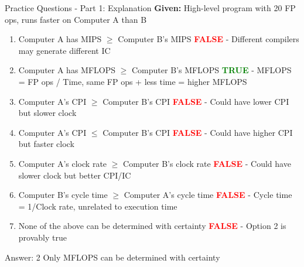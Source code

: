 \documentclass[aspectratio=169,12pt]{beamer}
\begin{document}
\begin{frame}{Practice Questions - Part 1: Explanation}
\small
\textbf{Given:} High-level program with 20 FP ops, runs faster on Computer A than B

\begin{enumerate}
    \item Computer A has MIPS $\geq$ Computer B's MIPS
    \pause \textcolor{red}{\textbf{FALSE}} - Different compilers may generate different IC
    \pause
    
    \item Computer A has MFLOPS $\geq$ Computer B's MFLOPS
    \pause \textcolor{green}{\textbf{TRUE}} - MFLOPS = FP ops / Time, same FP ops + less time = higher MFLOPS
    \pause
    
    \item Computer A's CPI $\geq$ Computer B's CPI
    \pause \textcolor{red}{\textbf{FALSE}} - Could have lower CPI but slower clock
    \pause
    
    \item Computer A's CPI $\leq$ Computer B's CPI  
    \pause \textcolor{red}{\textbf{FALSE}} - Could have higher CPI but faster clock
    \pause
    
    \item Computer A's clock rate $\geq$ Computer B's clock rate
    \pause \textcolor{red}{\textbf{FALSE}} - Could have slower clock but better CPI/IC
    \pause
    
    \item Computer B's cycle time $\geq$ Computer A's cycle time
    \pause \textcolor{red}{\textbf{FALSE}} - Cycle time = 1/Clock rate, unrelated to execution time
    \pause
    
    \item None of the above can be determined with certainty
    \pause \textcolor{red}{\textbf{FALSE}} - Option 2 is provably true
\end{enumerate}

\pause
\begin{alertblock}{Answer: 2}
Only MFLOPS can be determined with certainty
\end{alertblock}
\end{frame}
\end{document}
